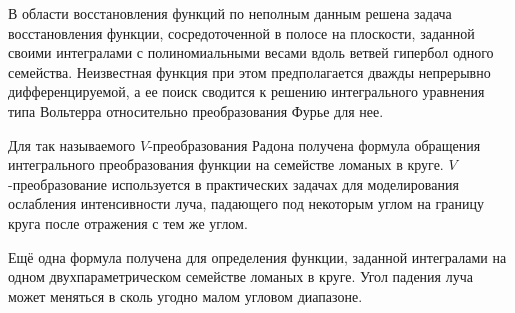 
В области восстановления функций по неполным данным решена задача восстановления функции, сосредоточенной в полосе на плоскости, заданной своими интегралами с полиномиальными весами вдоль ветвей гипербол одного семейства. Неизвестная функция при этом предполагается дважды непрерывно дифференцируемой, а ее поиск сводится к решению интегрального уравнения типа Вольтерра относительно преобразования Фурье для нее.

Для так называемого $V$-преобразования Радона получена формула обращения интегрального преобразования функции на семействе ломаных в круге. $V$-преобразование используется в практических задачах для моделирования ослабления интенсивности луча, падающего под некоторым углом на границу круга после отражения с тем же углом.

Ещё одна формула получена для определения функции, заданной интегралами на одном двухпараметрическом семействе ломаных в круге.  Угол падения луча может меняться в сколь угодно малом угловом диапазоне.












%
%

%
%
%
%




